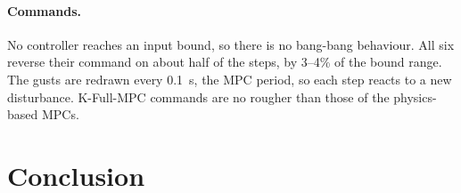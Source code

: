 \documentclass[11pt,a4paper]{article}
\newcommand{\KFullMPC}{\textsf{K-Full-MPC}}   %
\begin{document}
	\paragraph{Commands.} No controller reaches an input bound, so there is no bang-bang behaviour.
	All six reverse their command on about half of the steps, by 3--4\% of the bound range. The gusts
	are redrawn every 0.1~s, the MPC period, so each step reacts to a new disturbance. \KFullMPC{}
	commands are no rougher than those of the physics-based MPCs.

	\section{Conclusion}
	
\end{document}
